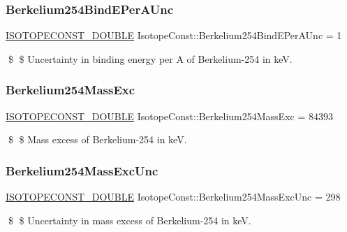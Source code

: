 \subsubsection{\texorpdfstring{Berkelium254\+Bind\+E\+Per\+A\+Unc}{Berkelium254BindEPerAUnc}}
{\footnotesize\ttfamily \mbox{\hyperlink{group___isotope_const-_macros_ga8f45a7272ce02c0b4c65c44636ed719a}{I\+S\+O\+T\+O\+P\+E\+C\+O\+N\+S\+T\+\_\+\+D\+O\+U\+B\+LE}} Isotope\+Const\+::\+Berkelium254\+Bind\+E\+Per\+A\+Unc = 1}

\$ \$ Uncertainty in binding energy per A of Berkelium-\/254 in keV. \mbox{\label{group___isotope_const-_berkelium-_bk254_ga964dba46ac53111245177ad55816cc25}} 
\subsubsection{\texorpdfstring{Berkelium254\+Mass\+Exc}{Berkelium254MassExc}}
{\footnotesize\ttfamily \mbox{\hyperlink{group___isotope_const-_macros_ga8f45a7272ce02c0b4c65c44636ed719a}{I\+S\+O\+T\+O\+P\+E\+C\+O\+N\+S\+T\+\_\+\+D\+O\+U\+B\+LE}} Isotope\+Const\+::\+Berkelium254\+Mass\+Exc = 84393}

\$ \$ Mass excess of Berkelium-\/254 in keV. \mbox{\label{group___isotope_const-_berkelium-_bk254_gafc0224c2fb82f5fd52f570ab8cb377f1}} 
\subsubsection{\texorpdfstring{Berkelium254\+Mass\+Exc\+Unc}{Berkelium254MassExcUnc}}
{\footnotesize\ttfamily \mbox{\hyperlink{group___isotope_const-_macros_ga8f45a7272ce02c0b4c65c44636ed719a}{I\+S\+O\+T\+O\+P\+E\+C\+O\+N\+S\+T\+\_\+\+D\+O\+U\+B\+LE}} Isotope\+Const\+::\+Berkelium254\+Mass\+Exc\+Unc = 298}

\$ \$ Uncertainty in mass excess of Berkelium-\/254 in keV. \mbox{\label{group___isotope_const-_berkelium-_bk254_ga5d7503428eca0b0368cbcc846b348a1e}} 
